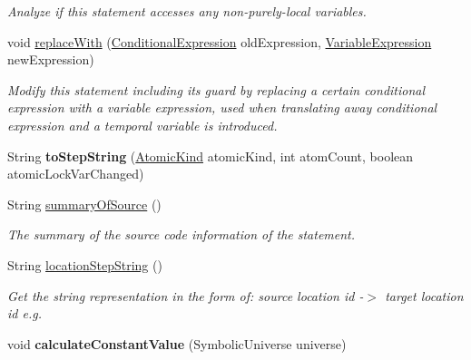 \begin{DoxyCompactItemize}
\begin{DoxyCompactList}\small\item\em Analyze if this statement accesses any non-\/purely-\/local variables. \end{DoxyCompactList}\item 
void \hyperlink{classedu_1_1udel_1_1cis_1_1vsl_1_1civl_1_1model_1_1common_1_1statement_1_1CommonStatement_a1a118e5f817744bbd084db23f06e9f61}{replace\+With} (\hyperlink{interfaceedu_1_1udel_1_1cis_1_1vsl_1_1civl_1_1model_1_1IF_1_1expression_1_1ConditionalExpression}{Conditional\+Expression} old\+Expression, \hyperlink{interfaceedu_1_1udel_1_1cis_1_1vsl_1_1civl_1_1model_1_1IF_1_1expression_1_1VariableExpression}{Variable\+Expression} new\+Expression)
\begin{DoxyCompactList}\small\item\em Modify this statement including its guard by replacing a certain conditional expression with a variable expression, used when translating away conditional expression and a temporal variable is introduced. \end{DoxyCompactList}\item 
\hypertarget{classedu_1_1udel_1_1cis_1_1vsl_1_1civl_1_1model_1_1common_1_1statement_1_1CommonStatement_a1ef72392991a02fe26a76f0ded2b9b45}{}String {\bfseries to\+Step\+String} (\hyperlink{enumedu_1_1udel_1_1cis_1_1vsl_1_1civl_1_1model_1_1IF_1_1location_1_1Location_1_1AtomicKind}{Atomic\+Kind} atomic\+Kind, int atom\+Count, boolean atomic\+Lock\+Var\+Changed)\label{classedu_1_1udel_1_1cis_1_1vsl_1_1civl_1_1model_1_1common_1_1statement_1_1CommonStatement_a1ef72392991a02fe26a76f0ded2b9b45}

\item 
String \hyperlink{classedu_1_1udel_1_1cis_1_1vsl_1_1civl_1_1model_1_1common_1_1statement_1_1CommonStatement_a4536eaec10f0b2a7cb6cbbb35c16ee3a}{summary\+Of\+Source} ()
\begin{DoxyCompactList}\small\item\em The summary of the source code information of the statement. \end{DoxyCompactList}\item 
String \hyperlink{classedu_1_1udel_1_1cis_1_1vsl_1_1civl_1_1model_1_1common_1_1statement_1_1CommonStatement_a9e34b76b970547cd88d138c06fd2d560}{location\+Step\+String} ()
\begin{DoxyCompactList}\small\item\em Get the string representation in the form of\+: source location id -\/$>$ target location id e.\+g. \end{DoxyCompactList}\item 
\hypertarget{classedu_1_1udel_1_1cis_1_1vsl_1_1civl_1_1model_1_1common_1_1statement_1_1CommonStatement_ad09421fc73405b9df691fa8a259145c2}{}void {\bfseries calculate\+Constant\+Value} (Symbolic\+Universe universe)\label{classedu_1_1udel_1_1cis_1_1vsl_1_1civl_1_1model_1_1common_1_1statement_1_1CommonStatement_ad09421fc73405b9df691fa8a259145c2}


\end{DoxyCompactItemize}

